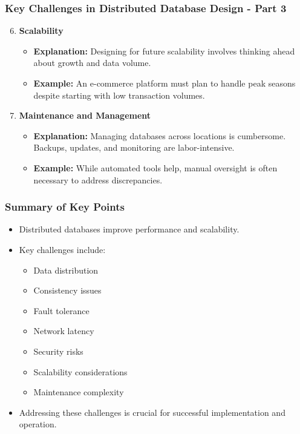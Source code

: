 \documentclass[aspectratio=169]{beamer}
\begin{document}
\begin{frame}[fragile]
    \frametitle{Key Challenges in Distributed Database Design - Part 3}
    \begin{enumerate}
        \setcounter{enumi}{5} %
        \item \textbf{Scalability}
            \begin{itemize}
                \item \textbf{Explanation:} Designing for future scalability involves thinking ahead about growth and data volume.
                \item \textbf{Example:} An e-commerce platform must plan to handle peak seasons despite starting with low transaction volumes.
            \end{itemize}
        
        \item \textbf{Maintenance and Management}
            \begin{itemize}
                \item \textbf{Explanation:} Managing databases across locations is cumbersome. Backups, updates, and monitoring are labor-intensive.
                \item \textbf{Example:} While automated tools help, manual oversight is often necessary to address discrepancies.
            \end{itemize}
    \end{enumerate}
\end{frame}

\begin{frame}[fragile]
    \frametitle{Summary of Key Points}
    \begin{itemize}
        \item Distributed databases improve performance and scalability.
        \item Key challenges include:
            \begin{itemize}
                \item Data distribution
                \item Consistency issues
                \item Fault tolerance
                \item Network latency
                \item Security risks
                \item Scalability considerations
                \item Maintenance complexity
            \end{itemize}
        \item Addressing these challenges is crucial for successful implementation and operation.
    \end{itemize}
\end{frame}
\end{document}
